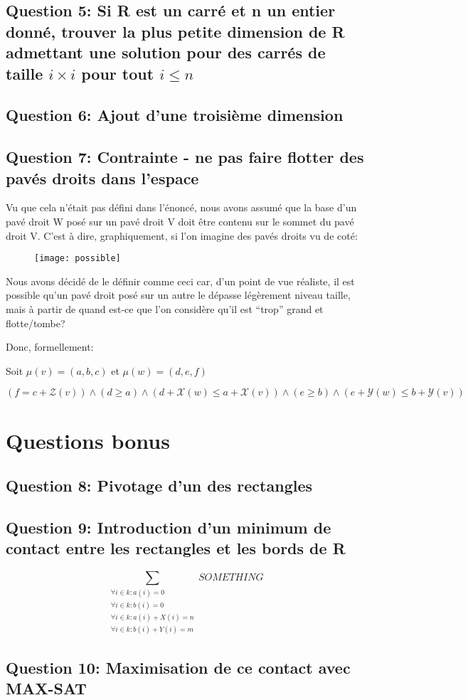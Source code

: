 \documentclass[a4paper,10pt]{article}
\begin{document}
\subsection{Question 5: Si R est un carré et n un entier donné, trouver la plus petite dimension de R admettant une solution pour des carrés de taille $i \times i$ pour tout $i \leq n$}

\subsection{Question 6: Ajout d'une troisième dimension}

\newpage

\subsection{Question 7: Contrainte - ne pas faire flotter des pavés droits dans l'espace}

Vu que cela n'était pas défini dans l'énoncé, nous avons assumé que la base d'un pavé droit W posé sur un pavé droit V doit être contenu sur le sommet du pavé droit V. C'est à dire, graphiquement, si l'on imagine des pavés droits vu de coté:

\begin{figure}[htb!]
\centering
\texttt{[image: possible]}
\end{figure}

Nous avons décidé de le définir comme ceci car, d'un point de vue réaliste, il est possible qu'un pavé droit posé sur un autre le dépasse légèrement niveau taille, mais à partir de quand est-ce que l'on considère qu'il est ``trop'' grand et flotte/tombe?

Donc, formellement: 

Soit $\mu(v) = (a,b,c)$ et $\mu(w) = (d,e,f)$

$(f = c + \mathcal{Z}(v)) \land (d \geq a) \land (d+\mathcal{X}(w) \leq a+\mathcal{X}(v)) \land (e \geq b) \land(e+\mathcal{Y}(w) \leq b+\mathcal{Y}(v))$ 

\section{Questions bonus}

\subsection{Question 8: Pivotage d'un des rectangles}

\subsection{Question 9: Introduction d'un minimum de contact entre les rectangles et les bords de R}

$$ \sum_{\substack{\forall i \in k : a(i) = 0\\
                \forall i \in k : b(i) = 0\\
                \forall i \in k : a(i)+ X(i) = n\\
                \forall i \in k : b(i)+ Y(i) = m }}
SOMETHING $$

\subsection{Question 10: Maximisation de ce contact avec MAX-SAT}
\end{document}
